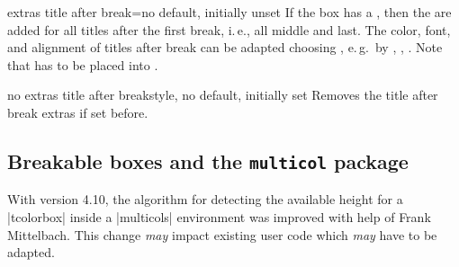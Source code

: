 \begin{docTcbKey}[][doc new=2018-07-26]{extras title after break}{=}{no default, initially unset}
  If the box has a , then the 
  are added for all titles after the first break, i.\,e., all middle and last.
  The color, font, and alignment of titles after break can be adapted choosing
  , e.\,g.\ by , ,
  .
  Note that  has to be placed into
  .
\end{docTcbKey}

\begin{docTcbKey}[][doc new=2018-07-26]{no extras title after break}{}{style, no default, initially set}
  Removes the title after break extras if set before.
\end{docTcbKey}

\bigskip





\clearpage
\subsection{Breakable boxes and the \texttt{multicol} package}\label{subsec:multicol}
\begin{marker}
With version 4.10, the algorithm for detecting the available height
for a |tcolorbox| inside a |multicols| environment was improved with help
of Frank Mittelbach. This change \emph{may} impact existing user
code which \emph{may} have to be adapted.
\end{marker}

